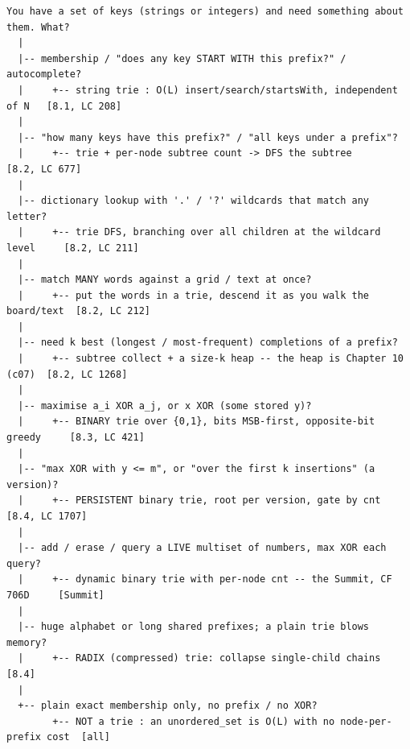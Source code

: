 \begin{lstlisting}[language={}, basicstyle=\ttfamily\small, numbers=none, frame=single]
  You have a set of keys (strings or integers) and need something about them. What?
  |
  |-- membership / "does any key START WITH this prefix?" / autocomplete?
  |     +-- string trie : O(L) insert/search/startsWith, independent of N   [8.1, LC 208]
  |
  |-- "how many keys have this prefix?" / "all keys under a prefix"?
  |     +-- trie + per-node subtree count -> DFS the subtree                [8.2, LC 677]
  |
  |-- dictionary lookup with '.' / '?' wildcards that match any letter?
  |     +-- trie DFS, branching over all children at the wildcard level     [8.2, LC 211]
  |
  |-- match MANY words against a grid / text at once?
  |     +-- put the words in a trie, descend it as you walk the board/text  [8.2, LC 212]
  |
  |-- need k best (longest / most-frequent) completions of a prefix?
  |     +-- subtree collect + a size-k heap -- the heap is Chapter 10 (c07)  [8.2, LC 1268]
  |
  |-- maximise a_i XOR a_j, or x XOR (some stored y)?
  |     +-- BINARY trie over {0,1}, bits MSB-first, opposite-bit greedy     [8.3, LC 421]
  |
  |-- "max XOR with y <= m", or "over the first k insertions" (a version)?
  |     +-- PERSISTENT binary trie, root per version, gate by cnt           [8.4, LC 1707]
  |
  |-- add / erase / query a LIVE multiset of numbers, max XOR each query?
  |     +-- dynamic binary trie with per-node cnt -- the Summit, CF 706D     [Summit]
  |
  |-- huge alphabet or long shared prefixes; a plain trie blows memory?
  |     +-- RADIX (compressed) trie: collapse single-child chains           [8.4]
  |
  +-- plain exact membership only, no prefix / no XOR?
        +-- NOT a trie : an unordered_set is O(L) with no node-per-prefix cost  [all]
\end{lstlisting}



